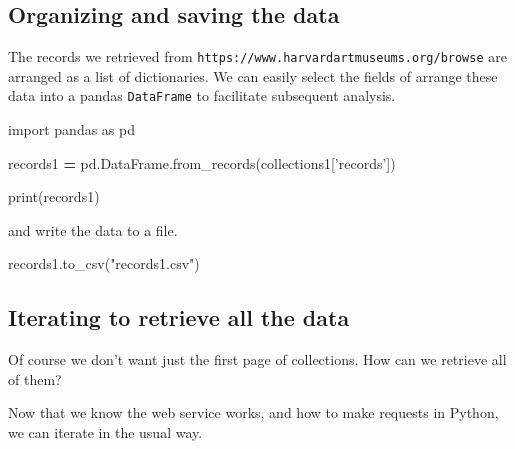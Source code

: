 \documentclass[]{book}
\newenvironment{Shaded}{\begin{snugshade}}{\end{snugshade}}
\newcommand{\StringTok}[1]{\textcolor[rgb]{0.31,0.60,0.02}{#1}}
\newcommand{\ImportTok}[1]{#1}
\newcommand{\OperatorTok}[1]{\textcolor[rgb]{0.81,0.36,0.00}{\textbf{#1}}}
\newcommand{\BuiltInTok}[1]{#1}
\newcommand{\NormalTok}[1]{#1}
\begin{document}
\subsection{Organizing and saving the
data}\label{organizing-and-saving-the-data}

The records we retrieved from
\texttt{https://www.harvardartmuseums.org/browse} are arranged as a list
of dictionaries. We can easily select the fields of arrange these data
into a pandas \texttt{DataFrame} to facilitate subsequent analysis.

\begin{Shaded}
\begin{Highlighting}[]
\ImportTok{import}\NormalTok{ pandas }\ImportTok{as}\NormalTok{ pd}
\end{Highlighting}
\end{Shaded}

\begin{Shaded}
\begin{Highlighting}[]
\NormalTok{records1 }\OperatorTok{=}\NormalTok{ pd.DataFrame.from_records(collections1[}\StringTok{'records'}\NormalTok{])}
\end{Highlighting}
\end{Shaded}

\begin{Shaded}
\begin{Highlighting}[]
\BuiltInTok{print}\NormalTok{(records1)}
\end{Highlighting}
\end{Shaded}

and write the data to a file.

\begin{Shaded}
\begin{Highlighting}[]
\NormalTok{records1.to_csv(}\StringTok{"records1.csv"}\NormalTok{)}
\end{Highlighting}
\end{Shaded}

\subsection{Iterating to retrieve all the
data}\label{iterating-to-retrieve-all-the-data}

Of course we don't want just the first page of collections. How can we
retrieve all of them?

Now that we know the web service works, and how to make requests in
Python, we can iterate in the usual way.
\end{document}
